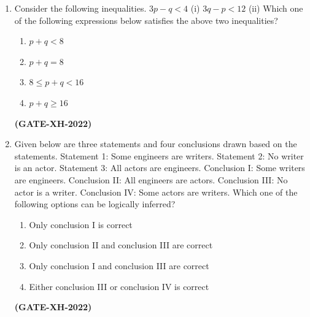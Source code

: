 \documentclass[journal]{IEEEtran}
\begin{document}
\begin{enumerate}
\item Consider the following inequalities. $3p-q<4$ (i) $3q-p<12$ (ii) Which one of the following expressions below satisfies the above two inequalities?
\begin{multicols}{4}
\begin{enumerate}
\item $p+q<8$
\item $p+q=8$
\item $8\le p+q<16$
\item $p+q\ge16$
\end{enumerate}
\end{multicols}
\hfill\textbf{(GATE-XH-2022)}

\item Given below are three statements and four conclusions drawn based on the statements. Statement 1: Some engineers are writers. Statement 2: No writer is an actor. Statement 3: All actors are engineers. Conclusion I: Some writers are engineers. Conclusion II: All engineers are actors. Conclusion III: No actor is a writer. Conclusion IV: Some actors are writers. Which one of the following options can be logically inferred?
\begin{enumerate}
\item Only conclusion I is correct
\item Only conclusion II and conclusion III are correct
\item Only conclusion I and conclusion III are correct
\item Either conclusion III or conclusion IV is correct
\end{enumerate}
\hfill\textbf{(GATE-XH-2022)}


\end{enumerate}
\end{document}
